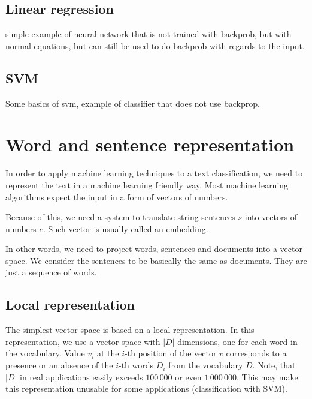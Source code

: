     \* %
    
    \subsection{Linear regression}
    \* %
    simple example of neural network that is not trained with backprob, but with normal equations,  
        but can still be used to do backprob with regards to the input.
    
    \subsection{SVM}
    \* %
    \* %
    Some basics of svm, example of classifier that does not use backprop.
    
    
\section{Word and sentence representation}

    In order to apply machine learning techniques to a text classification, 
    we need to represent the text in a machine learning friendly way.
    Most machine learning algorithms expect the input in a form of vectors of numbers. 
    
    Because of this, we need a system to translate string sentences $s$ into vectors of numbers $e$.
    Such vector is usually called an embedding. 
    
    In  other words, we need to project words, sentences and documents into a vector space.
    We consider the sentences to be basically the same as documents. 
    They are just a sequence of words.
    
    \subsection{Local representation}
    
    The simplest vector space is based on a local representation.
    In this representation, we use a vector space with $|D|$ dimensions, one for each word in the vocabulary.
    Value $v_i$ at the $i$-th position of the vector $v$ corresponds to a presence or an absence of the $i$-th words $D_i$ from the vocabulary $D$.
    Note, that $|D|$ in real applications easily exceeds $100\,000$ or even $1\,000\,000$.
    This may make this representation unusable for some applications (classification with SVM).
    
